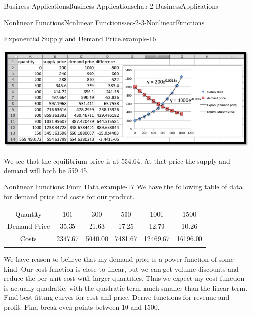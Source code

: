 \documentclass[oneside,10pt,]{book}
\numberwithin{equation}{section}
\newcommand{\hrulethin}  {\noalign{\hrule height 0.04em}}
\newcommand{\hrulemedium}{\noalign{\hrule height 0.07em}}
\newcommand{\hrulethick} {\noalign{\hrule height 0.11em}}
\begin{document}
\begin{chapterptx}{Business Applications}{}{Business Applications}{}{}{chap-2-BusinessApplications}
\begin{sectionptx}{Nonlinear Functions}{}{Nonlinear Functions}{}{}{sec-2-3-NonlinearFunctions}
\begin{example}{Exponential Supply and Demand Price.}{example-16}
\begin{equation*}
\end{equation*}
\begin{sidebyside}{1}{0.05}{0.05}{0}%
\begin{sbspanel}{0.9}%
\includegraphics[width=1\linewidth]{images/sec2-3-1.png}
\end{sbspanel}%
\end{sidebyside}%
\par
\hypertarget{p-773}{}%
We see that the equilibrium price is at \textdollar{}554.64.  At that price the supply and demand will both be 559.45.%
\end{example}
\begin{example}{Nonlinear Functions From Data.}{example-17}%
\hypertarget{p-774}{}%
We have the following table of data for demand price and costs for our product.%
\begin{sidebyside}{1}{0}{0}{0}%
\begin{sbspanel}{1}%
{\centering%
\begin{tabular}{cccccc}\hrulethick
Quantity&100&300&500&1000&1500\tabularnewline\hrulethin
Demand Price&\textdollar{}35.35&\textdollar{}21.63&\textdollar{}17.25&\textdollar{}12.70&\textdollar{}10.26\tabularnewline\hrulemedium
Costs&\textdollar{}2347.67&\textdollar{}5040.00&\textdollar{}7481.67&\textdollar{}12469.67&\textdollar{}16196.00\tabularnewline\hrulemedium
\end{tabular}
\par}
\end{sbspanel}%
\end{sidebyside}%
\par
\hypertarget{p-775}{}%
We have reason to believe that my demand price is a power function of some kind.  Our cost function is close to linear, but we can get volume discounts and reduce the per-unit cost with larger quantities. Thus we expect my cost function is actually quadratic, with the quadratic term much smaller than the linear term.  Find best fitting curves for cost and price.  Derive functions for revenue and profit.  Find break-even points between 10 and 1500.%

\end{example}
\end{sectionptx}
\end{chapterptx}
\end{document}
